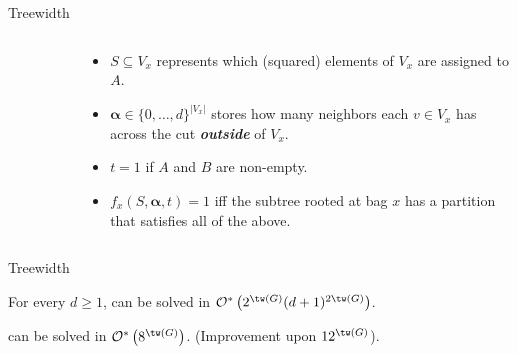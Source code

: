 \begin{frame}{Treewidth}
\begin{columns}[T]
\begin{column}{0.4\textwidth}
\begin{figure}[!htb]
            \end{figure}
        \end{column}
        \begin{column}{0.55\textwidth}
            \begin{itemize}
                \item<2-> $S \subseteq V_x$ represents which (squared) elements of $V_x$ are assigned to $A$.
                \item<3-> $\mathbf{\alpha} \in \{0, \dots, d\}^{|V_x|}$ stores how many neighbors each $v \in V_x$ has across the cut \textbf{\textit{outside}} of $V_x$.
                \item<4-> $t = 1$ if $A$ and $B$ are non-empty. 
                \item<5-> $f_x(S, \mathbf{\alpha}, t) = 1$ iff the subtree rooted at bag $x$ has a partition that satisfies all of the above.
            \end{itemize}
        \end{column}
    \end{columns}
\end{frame}

\begin{frame}{Treewidth}
    \begin{theorem}
        For every $d \geq 1$,  can be solved in $\bigOs{2^{\tw(G)}(d+1)^{2\tw(G)}}$.
    \end{theorem}
    \pause
    \begin{corollary}
         can be solved in $\bigOs{8^{\tw(G)}}$. (Improvement upon $12^{\tw(G)}$).
    \end{corollary}
\end{frame}

